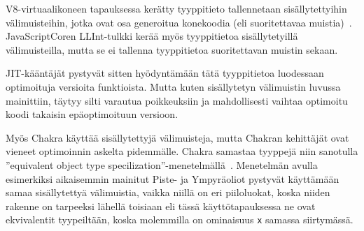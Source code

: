 V8-virtuaalikoneen tapauksessa kerätty tyyppitieto tallennetaan sisällytettyihin välimuisteihin, jotka ovat osa generoitua konekoodia (eli suoritettavaa muistia)~\cite{llint}. JavaScriptCoren LLInt-tulkki kerää myös tyyppitietoa sisällytetyillä välimuisteilla, mutta se ei tallenna tyyppitietoa suoritettavan muistin sekaan.

JIT-kääntäjät pystyvät sitten hyödyntämään tätä tyyppitietoa luodessaan optimoituja versioita funktioista. Mutta kuten sisällytetyn välimuistin luvussa mainittiin, täytyy silti varautua poikkeuksiin ja mahdollisesti vaihtaa optimoitu koodi takaisin epäoptimoituun versioon.

Myös Chakra käyttää sisällytettyjä välimuisteja, mutta Chakran kehittäjät ovat vieneet optimoinnin askelta pidemmälle. Chakra samastaa tyyppejä niin sanotulla ''equivalent object type specilization''-menetelmällä~\cite{chakra}. Menetelmän avulla esimerkiksi aikaisemmin mainitut Piste- ja Ympyräoliot pystyvät käyttämään samaa sisällytettyä välimuistia, vaikka niillä on eri piiloluokat, koska niiden rakenne on tarpeeksi lähellä toisiaan eli tässä käyttötapauksessa ne ovat ekvivalentit tyypeiltään, koska molemmilla on ominaisuus \texttt{x} samassa siirtymässä.

\begin{comment}
\begin{itemize}
\item \url{https://wiki.mozilla.org/TypeInference}
\item SpiderMonkey: Staattisen ja dynaamisen päättelyn yhdistelmä!
\item \url{https://trac.webkit.org/wiki/JavaScriptCore#TypeInference}
\end{itemize}
\end{comment}